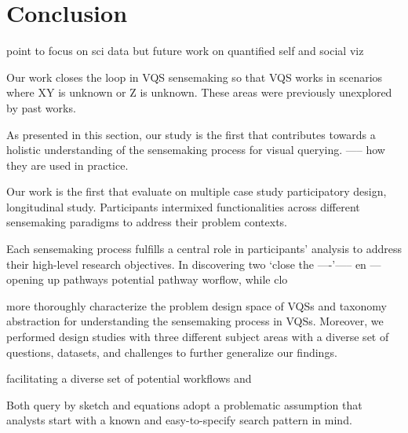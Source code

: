 \section{Conclusion\label{sec:conclusion}}
point to focus on sci data but future work on quantified self and social viz


Our work closes the loop in VQS sensemaking so that VQS works in scenarios  where XY is unknown or Z is unknown. These areas were previously unexplored by past works.

As presented in this section, our study is the first that contributes towards a holistic understanding of the sensemaking process for visual querying.
----- how they are used in practice. %

Our work is the first that evaluate on multiple case study participatory design, longitudinal study. 
Participants intermixed functionalities across different sensemaking paradigms to address their problem contexts.


Each sensemaking process fulfills a central role in participants' analysis to address their high-level research objectives. In discovering two `close the ----'----- en ---opening up pathways  potential pathway worflow, while clo

 more thoroughly characterize the problem design space of VQSs and taxonomy abstraction for understanding the sensemaking process in VQSs. Moreover, we performed design studies with three different subject areas with a diverse set of questions, datasets, and challenges to further generalize our findings.

 facilitating a diverse set of potential workflows and 

 Both query by sketch and equations adopt a problematic assumption that analysts start with a known and easy-to-specify search pattern in mind. 